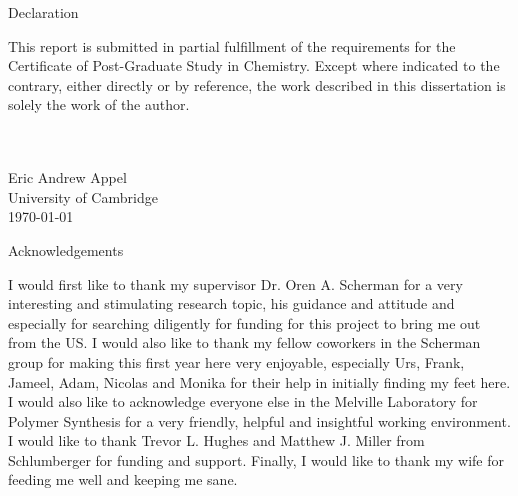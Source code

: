 \documentclass[a4paper,12pt]{report} %
\begin{document}
\doublespacing


\begin{center}
\Large{Declaration}
\end{center}
\noindent
This report is submitted in partial fulfillment of the requirements for the Certificate of Post-Graduate Study in Chemistry. Except where indicated to the contrary, either directly or by reference, the work described in this dissertation is solely the work of the author. 
\\
\\ 
\\
\begin{flushright}
Eric Andrew Appel\\
University of Cambridge\\
\today
\end{flushright}


\newpage
\begin{center}
\Large{Acknowledgements}
\end{center}
\noindent
I would first like to thank my supervisor Dr. Oren A. Scherman for a very interesting and stimulating research topic, his guidance and attitude and especially for searching diligently for funding for this project to bring me out from the US. I would also like to thank my fellow coworkers in the Scherman group for making this first year here very enjoyable, especially Urs, Frank, Jameel, Adam, Nicolas and Monika for their help in initially finding my feet here. I would also like to acknowledge everyone else in the Melville Laboratory for Polymer Synthesis for a very friendly, helpful and insightful working environment. I would like to thank Trevor L. Hughes and Matthew J. Miller from Schlumberger for funding and support. Finally, I would like to thank my wife for feeding me well and keeping me sane.
\end{document}
